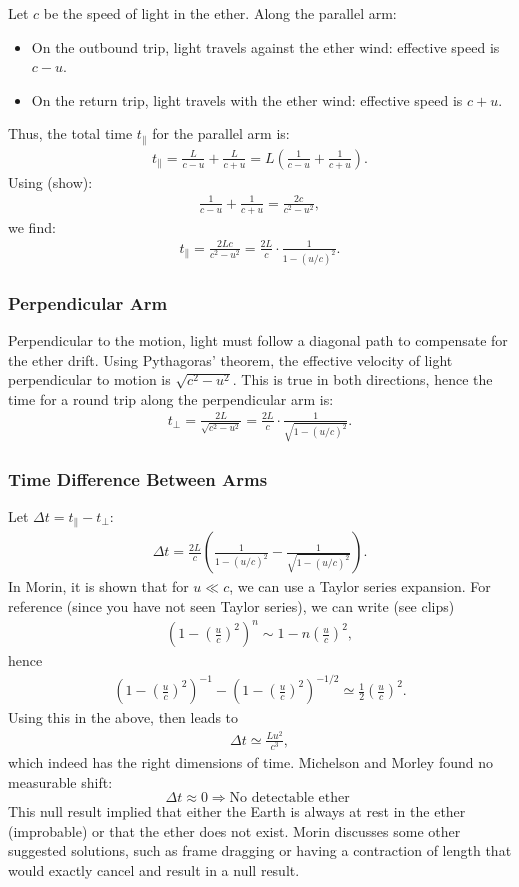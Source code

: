 \documentclass[12pt]{article}
\newcommand{\be}{\begin{eqnarray}}
\newcommand{\ee}{\end{eqnarray}}
\begin{document}
Let $c$ be the speed of light in the ether. Along the parallel arm:

\begin{itemize}
  \item On the outbound trip, light travels against the ether wind: effective speed is $c-u$.
  \item On the return trip, light travels with the ether wind: effective speed is $c+u$.
\end{itemize}
Thus, the total time $t_\parallel$ for the parallel arm is:
\be
t_\parallel = \frac{L}{c-u} + \frac{L}{c+u} = L\left( \frac{1}{c-u} + \frac{1}{c+u} \right).
\ee
Using (show):
\be
\frac{1}{c-u} + \frac{1}{c+u} = \frac{2c}{c^2-u^2},
\ee
we find:
\be
t_\parallel = \frac{2Lc}{c^2-u^2} = \frac{2L}{c} \cdot \frac{1}{1-(u/c)^2}.
\ee

\subsubsection{Perpendicular Arm}
Perpendicular to the motion, light must follow a diagonal path to compensate for the ether drift. Using Pythagoras' theorem, the effective velocity of light perpendicular to motion is \(\sqrt{c^2-u^2}\). This is true in both directions, hence the time for a round trip along the perpendicular arm is:
\be
t_\perp = \frac{2L}{\sqrt{c^2-u^2}} = \frac{2L}{c} \cdot \frac{1}{\sqrt{1-(u/c)^2}}.
\ee

\subsubsection{Time Difference Between Arms}

Let $\Delta t = t_\parallel - t_\perp$:
\be
\Delta t = \frac{2L}{c} \left( \frac{1}{1-(u/c)^2} - \frac{1}{\sqrt{1-(u/c)^2}} \right).
\ee
In Morin, it is shown that for $u\ll c$, we can use a Taylor series expansion. For reference (since you have not seen Taylor series), we can write (see clips)
\be
\left(1-\left(\frac{u}{c}\right)^2\right)^n \sim 1-n\left(\frac{u}{c}\right)^2,
\ee
hence 
\be
\left(1-\left(\frac{u}{c}\right)^2\right)^{-1} - \left(1-\left(\frac{u}{c}\right)^2\right)^{-1/2}  \simeq \frac{1}{2}\left(\frac{u}{c}\right)^2.
\ee
Using this in the above, then leads to 
\be
\Delta t \simeq \frac{L u^2}{c^3},
\ee
which indeed has the right dimensions of time. Michelson and Morley found no measurable shift:
\[
\Delta t \approx 0 \Rightarrow \text{No detectable ether }
\]
This null result implied that either the Earth is always at rest in the ether (improbable) or that the ether does not exist. Morin discusses some other suggested solutions, such as frame dragging or having a contraction of length that would exactly cancel and result in a null result. 
\end{document}
